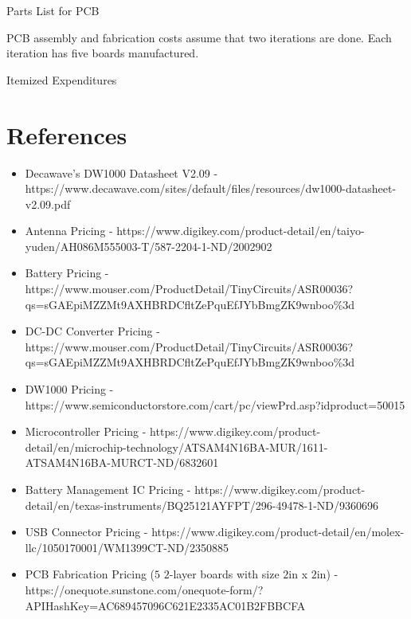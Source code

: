 \documentclass{article}
\begin{document}
\FloatBarrier

 \begin{table}[h!]
 	\centering
 	\caption{Parts List for PCB}
 	\label{tab:partslist}
\end{table}

\FloatBarrier

PCB assembly and fabrication costs assume that two iterations are done.
Each iteration has five boards manufactured.

\FloatBarrier

\begin{table}[h!]
  	\centering
  	\caption{Itemized Expenditures}
  	\label{tab:costs}
\end{table}

\FloatBarrier

\section{References}
\begin{itemize}
\item Decawave's DW1000 Datasheet V2.09 - https://www.decawave.com/sites/default/files/resources/dw1000-datasheet-v2.09.pdf
\item Antenna Pricing - https://www.digikey.com/product-detail/en/taiyo-yuden/AH086M555003-T/587-2204-1-ND/2002902 
\item Battery Pricing - https://www.mouser.com/ProductDetail/TinyCircuits/ASR00036?qs=sGAEpiMZZMt9AXHBRDCfltZePquEfJYbBmgZK9wnboo\%3d
\item DC-DC Converter Pricing - https://www.mouser.com/ProductDetail/TinyCircuits/ASR00036?qs=sGAEpiMZZMt9AXHBRDCfltZePquEfJYbBmgZK9wnboo\%3d
\item DW1000 Pricing - https://www.semiconductorstore.com/cart/pc/viewPrd.asp?idproduct=50015
\item Microcontroller Pricing - https://www.digikey.com/product-detail/en/microchip-technology/ATSAM4N16BA-MUR/1611-ATSAM4N16BA-MURCT-ND/6832601
\item Battery Management IC Pricing - https://www.digikey.com/product-detail/en/texas-instruments/BQ25121AYFPT/296-49478-1-ND/9360696
\item USB Connector Pricing - https://www.digikey.com/product-detail/en/molex-llc/1050170001/WM1399CT-ND/2350885
\item PCB Fabrication Pricing ($5$ $2$-layer boards with size $2$in x $2$in) - https://onequote.sunstone.com/onequote-form/?APIHashKey=AC689457096C621E2335AC01B2FBBCFA
\end{itemize}
\end{document}
